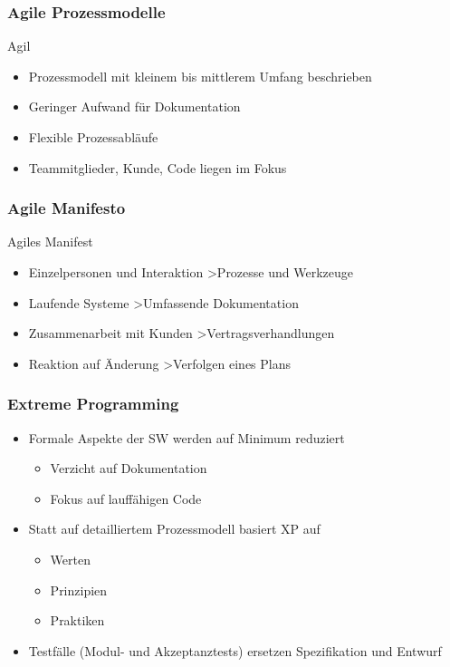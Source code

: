 \begin{frame}
\frametitle{Agile Prozessmodelle}
	\begin{block}{Agil}
		\begin{itemize}
			\item Prozessmodell mit kleinem bis mittlerem Umfang beschrieben
			\item Geringer Aufwand für Dokumentation
			\item Flexible Prozessabläufe
			\item Teammitglieder, Kunde, Code liegen im Fokus
		\end{itemize}
	\end{block}
\end{frame}

\begin{frame}
\frametitle{Agile Manifesto}
	\begin{block}{Agiles Manifest}
		\begin{itemize}
			\item Einzelpersonen und Interaktion \textgreater Prozesse und Werkzeuge
			\item Laufende Systeme \textgreater Umfassende Dokumentation
			\item Zusammenarbeit mit Kunden \textgreater Vertragsverhandlungen
			\item Reaktion auf Änderung \textgreater Verfolgen eines Plans
		\end{itemize}
	\end{block}
\end{frame}

\begin{frame}
\frametitle{Extreme Programming}
	\begin{itemize}
		\item Formale Aspekte der SW werden auf Minimum reduziert
					\begin{itemize}
						\item Verzicht auf Dokumentation
						\item Fokus auf lauffähigen Code
					\end{itemize}
		\item Statt auf detailliertem Prozessmodell basiert XP auf
					\begin{itemize}
						\item Werten
						\item Prinzipien
						\item Praktiken
					\end{itemize}
		\item Testfälle (Modul- und Akzeptanztests) ersetzen Spezifikation und Entwurf
	\end{itemize}
\end{frame}

